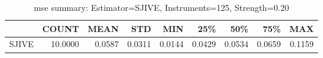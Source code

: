 \begin{table}[ht]
\centering
\caption{mse summary: Estimator=SJIVE, Instruments=125, Strength=0.20}
\begin{tabular}{lrrrrrrrr}
\toprule
 & COUNT & MEAN & STD & MIN & 25\% & 50\% & 75\% & MAX \\
\midrule
SJIVE & 10.0000 & 0.0587 & 0.0311 & 0.0144 & 0.0429 & 0.0534 & 0.0659 & 0.1159 \\
\bottomrule
\end{tabular}
\end{table}
